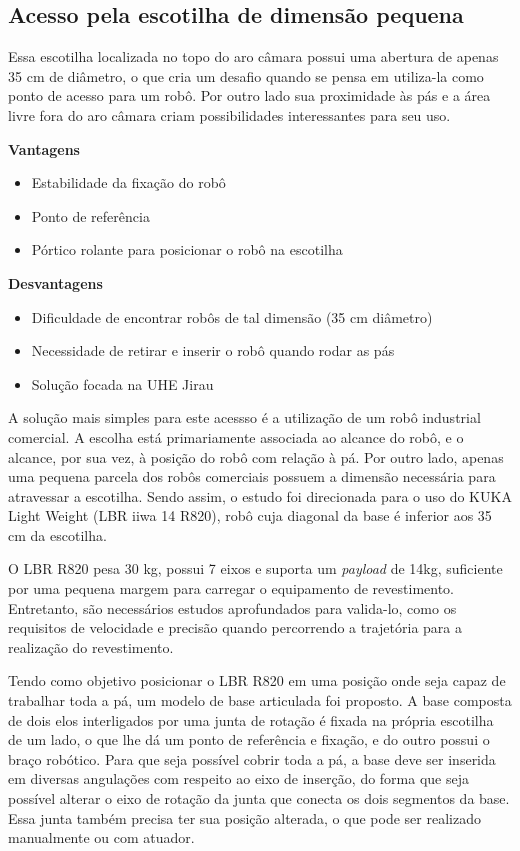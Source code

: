 \subsection{Acesso pela escotilha de dimensão pequena}

Essa escotilha localizada no topo do aro câmara possui uma abertura de apenas
35 cm de diâmetro, o que cria um desafio quando se pensa em utiliza-la como
ponto de acesso para um robô. Por outro lado sua proximidade às pás e a área livre fora do aro
câmara criam possibilidades interessantes para seu uso.

\textbf{Vantagens}
\begin{itemize}
  \item Estabilidade da fixação do robô
  \item Ponto de referência
  \item Pórtico rolante para posicionar o robô na escotilha
\end{itemize}

\textbf{Desvantagens}
\begin{itemize}
  \item Dificuldade de encontrar robôs de tal dimensão (35 cm diâmetro)
  \item Necessidade de retirar e inserir o robô quando rodar as pás
  \item Solução focada na UHE Jirau
\end{itemize}

A solução mais simples para este acessso é a utilização de um robô industrial
comercial. A escolha está primariamente associada ao alcance do robô, e o
alcance, por sua vez, à posição do robô com relação à pá. Por outro lado, apenas
uma pequena parcela dos robôs comerciais possuem a dimensão necessária para
atravessar a escotilha. Sendo assim, o estudo foi direcionada para o uso do
KUKA Light Weight (LBR iiwa 14 R820), robô cuja diagonal da base é inferior aos
35 cm da escotilha.

O LBR R820 pesa 30 kg, possui 7 eixos e suporta um \textit{payload} de 14kg,
suficiente por uma pequena margem para carregar o equipamento de
revestimento. Entretanto, são necessários estudos aprofundados para valida-lo,
como os requisitos de velocidade e precisão quando percorrendo a trajetória
para a realização do revestimento.

Tendo como objetivo posicionar o LBR R820 em uma posição onde seja capaz de
trabalhar toda a pá, um modelo de base articulada foi proposto. A base
composta de dois elos interligados por uma junta de rotação é fixada na
própria escotilha de um lado, o que lhe dá um ponto de referência e fixação, e
do outro possui o braço robótico. Para que seja possível cobrir toda a pá,
a base deve ser inserida em diversas angulações com respeito ao
eixo de inserção, do forma que seja possível alterar o eixo de rotação da junta
que conecta os dois segmentos da base. Essa junta também precisa ter sua posição
alterada, o que pode ser realizado manualmente ou com atuador.

